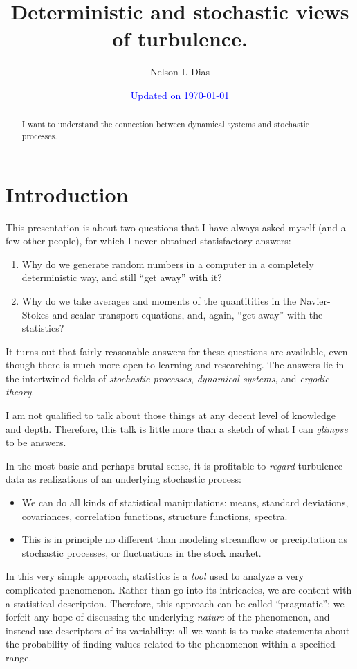 \documentclass[12pt]{article}
\title{Deterministic and stochastic views of turbulence.}
\author{Nelson L Dias}
\date{\textcolor{blue}{Updated on \today}}
\begin{document}
\maketitle

\begin{abstract}
I want to understand the connection between dynamical systems and stochastic processes.
\end{abstract}

\section{Introduction}

This presentation is about two questions that I have always asked myself (and a
few other people), for which I never obtained statisfactory answers:
\begin{enumerate}
   \item Why do we generate random numbers in a computer in a completely
     deterministic way, and still ``get away'' with it?
   \item Why do we take averages and moments of the quantitities in the
     Navier-Stokes and scalar transport equations, and, again,
``get away'' with the statistics?
\end{enumerate}


It turns out that fairly reasonable answers for these questions are available,
even though there is much more open to learning and researching.  The answers
lie in the intertwined fields of \emph{stochastic processes}, \emph{dynamical
  systems}, and \emph{ergodic theory}. 

I am not qualified to talk about those things at any decent level of knowledge
and depth. Therefore, this talk is little more than a sketch of what I can
\emph{glimpse} to be answers.


In the most basic and perhaps brutal sense, it is profitable to \emph{regard}
turbulence data as realizations of an underlying stochastic process:
\begin{itemize}
\item We can do all kinds of statistical manipulations: means, standard
  deviations, covariances, correlation functions, structure functions, spectra.
\item This is in principle no different than modeling streamflow or
  precipitation as stochastic processes, or fluctuations in the stock market.
\end{itemize}

In this very simple approach, statistics is a \emph{tool} used to analyze a very
complicated phenomenon.  Rather than go into its intricacies, we are content
with a statistical description. Therefore, this approach can be called
``pragmatic'': we forfeit any hope of discussing the underlying \emph{nature} of
the phenomenon, and instead use descriptors of its variability: all we want is
to make statements about the probability of finding values related to the
phenomenon within a specified range.
\end{document}
